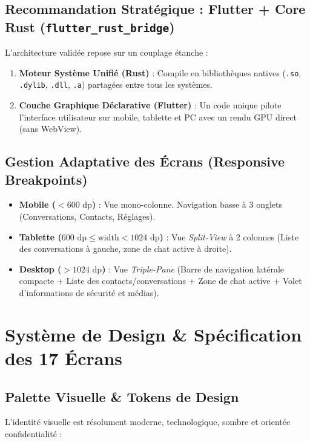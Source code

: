 \documentclass[11pt,a4paper]{article}
\begin{document}
\subsection{Recommandation Stratégique : Flutter + Core Rust (\texttt{flutter\_rust\_bridge})}
L'architecture validée repose sur un couplage étanche :
\begin{enumerate}
    \item \textbf{Moteur Système Unifié (Rust)} : Compile en bibliothèques natives (\texttt{.so}, \texttt{.dylib}, \texttt{.dll}, \texttt{.a}) partagées entre tous les systèmes.
    \item \textbf{Couche Graphique Déclarative (Flutter)} : Un code unique pilote l'interface utilisateur sur mobile, tablette et PC avec un rendu GPU direct (sans WebView).
\end{enumerate}

\subsection{Gestion Adaptative des Écrans (Responsive Breakpoints)}
\begin{itemize}
    \item \textbf{Mobile ($< 600\text{ dp}$)} : Vue mono-colonne. Navigation basse à 3 onglets (Conversations, Contacts, Réglages).
    \item \textbf{Tablette ($600\text{ dp} \le \text{width} < 1024\text{ dp}$)} : Vue \textit{Split-View} à 2 colonnes (Liste des conversations à gauche, zone de chat active à droite).
    \item \textbf{Desktop ($> 1024\text{ dp}$)} : Vue \textit{Triple-Pane} (Barre de navigation latérale compacte + Liste des contacts/conversations + Zone de chat active + Volet d'informations de sécurité et médias).
\end{itemize}

\vspace{0.3cm}

\section{Système de Design \& Spécification des 17 Écrans}

\subsection{Palette Visuelle \& Tokens de Design}
L'identité visuelle est résolument moderne, technologique, sombre et orientée confidentialité :
\end{document}
